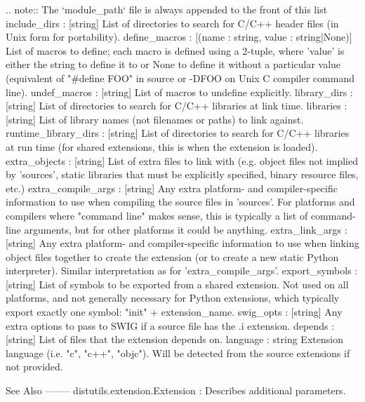 \begin{DoxyVerb}
    .. note:: The `module_path` file is always appended to the front of
       this list
include_dirs : [string]
    List of directories to search for C/C++ header files (in Unix
    form for portability).
define_macros : [(name : string, value : string|None)]
    List of macros to define; each macro is defined using a 2-tuple,
    where 'value' is either the string to define it to or None to
    define it without a particular value (equivalent of "#define
    FOO" in source or -DFOO on Unix C compiler command line).
undef_macros : [string]
    List of macros to undefine explicitly.
library_dirs : [string]
    List of directories to search for C/C++ libraries at link time.
libraries : [string]
    List of library names (not filenames or paths) to link against.
runtime_library_dirs : [string]
    List of directories to search for C/C++ libraries at run time
    (for shared extensions, this is when the extension is loaded).
extra_objects : [string]
    List of extra files to link with (e.g. object files not implied
    by 'sources', static libraries that must be explicitly specified,
    binary resource files, etc.)
extra_compile_args : [string]
    Any extra platform- and compiler-specific information to use
    when compiling the source files in 'sources'.  For platforms and
    compilers where "command line" makes sense, this is typically a
    list of command-line arguments, but for other platforms it could
    be anything.
extra_link_args : [string]
    Any extra platform- and compiler-specific information to use
    when linking object files together to create the extension (or
    to create a new static Python interpreter).  Similar
    interpretation as for 'extra_compile_args'.
export_symbols : [string]
    List of symbols to be exported from a shared extension.  Not
    used on all platforms, and not generally necessary for Python
    extensions, which typically export exactly one symbol: "init" +
    extension_name.
swig_opts : [string]
    Any extra options to pass to SWIG if a source file has the .i
    extension.
depends : [string]
    List of files that the extension depends on.
language : string
    Extension language (i.e. "c", "c++", "objc").  Will be detected
    from the source extensions if not provided.

See Also
--------
distutils.extension.Extension : Describes additional parameters.\end{DoxyVerb}
 \hypertarget{namespacescipy_1_1weave_1_1inline__tools_a0648335e897ea2ef53d6f1b6c15c4073}{}
